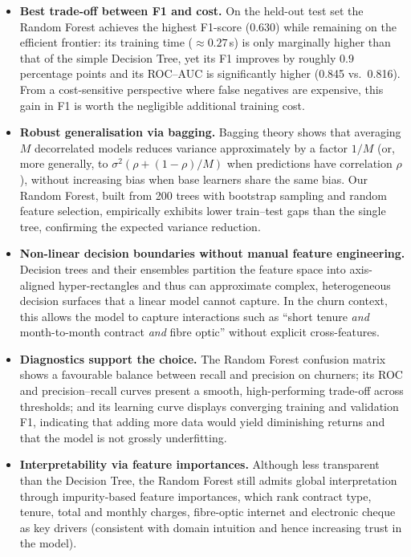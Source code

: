 \documentclass[11pt,a4paper]{article}
\begin{document}
\begin{itemize}
    \item \textbf{Best trade-off between F1 and cost.} On the held-out test set the Random Forest achieves the highest F1-score (0.630) while remaining on the efficient frontier: its training time ($\approx 0.27$\,s) is only marginally higher than that of the simple Decision Tree, yet its F1 improves by roughly $0.9$ percentage points and its ROC--AUC is significantly higher (0.845 vs.\ 0.816). From a cost-sensitive perspective where false negatives are expensive, this gain in F1 is worth the negligible additional training cost.
    \item \textbf{Robust generalisation via bagging.} Bagging theory shows that averaging $M$ decorrelated models reduces variance approximately by a factor $1/M$ (or, more generally, to $\sigma^2(\rho + (1-\rho)/M)$ when predictions have correlation $\rho$), without increasing bias when base learners share the same bias. Our Random Forest, built from 200 trees with bootstrap sampling and random feature selection, empirically exhibits lower train–test gaps than the single tree, confirming the expected variance reduction.
    \item \textbf{Non-linear decision boundaries without manual feature engineering.} Decision trees and their ensembles partition the feature space into axis-aligned hyper-rectangles and thus can approximate complex, heterogeneous decision surfaces that a linear model cannot capture. In the churn context, this allows the model to capture interactions such as ``short tenure \emph{and} month-to-month contract \emph{and} fibre optic'' without explicit cross-features.
    \item \textbf{Diagnostics support the choice.} The Random Forest confusion matrix shows a favourable balance between recall and precision on churners; its ROC and precision–recall curves present a smooth, high-performing trade-off across thresholds; and its learning curve displays converging training and validation F1, indicating that adding more data would yield diminishing returns and that the model is not grossly underfitting.
    \item \textbf{Interpretability via feature importances.} Although less transparent than the Decision Tree, the Random Forest still admits global interpretation through impurity-based feature importances, which rank contract type, tenure, total and monthly charges, fibre-optic internet and electronic cheque as key drivers (consistent with domain intuition and hence increasing trust in the model).
\end{itemize}
\end{document}
